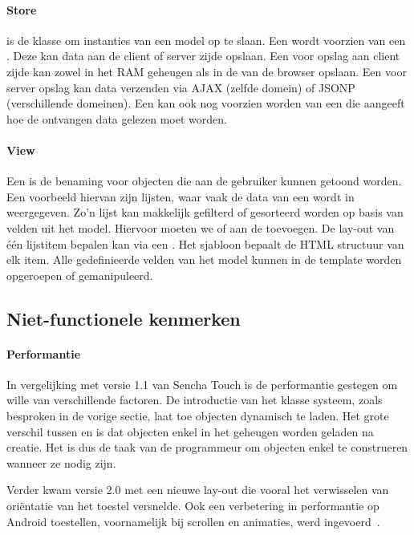 \paragraph{Store}
 is de klasse om instanties van een model op te slaan.  
Een  wordt voorzien van een .  
Deze kan data aan de client of server zijde opslaan.  
Een  voor opslag aan client zijde kan zowel in het RAM geheugen als in de  van de browser opslaan.  
Een  voor server opslag kan data verzenden via AJAX (zelfde domein) of JSONP (verschillende domeinen).  
Een  kan ook nog voorzien worden van een  die aangeeft hoe de ontvangen data gelezen moet worden.

\paragraph{View}
Een  is de benaming voor objecten die aan de gebruiker kunnen getoond worden.  
Een voorbeeld hiervan zijn lijsten,  waar vaak de data van een  wordt in weergegeven.  
Zo'n lijst kan makkelijk gefilterd of gesorteerd worden op basis van velden uit het model.  
Hiervoor moeten we  of  aan de  toevoegen. 
De lay-out van één lijstitem bepalen kan via een .  
Het sjabloon bepaalt de HTML structuur van elk item.  
Alle gedefinieerde velden van het model kunnen in de template worden opgeroepen of gemanipuleerd.


\subsection{Niet-functionele kenmerken}
\paragraph{Performantie}
In vergelijking met versie 1.1 van Sencha Touch is de performantie gestegen om wille van verschillende factoren.  
De introductie van het klasse systeem,  zoals besproken in de vorige sectie,  laat toe objecten dynamisch te laden. 
Het grote verschil tussen  en  is dat objecten enkel in het geheugen worden geladen na creatie.  
Het is dus de taak van de programmeur om objecten enkel te construeren wanneer ze nodig zijn.

Verder kwam versie 2.0 met een nieuwe lay-out  die vooral het verwisselen van oriëntatie van het toestel versnelde.  
Ook een verbetering in performantie op Android toestellen,  voornamelijk bij scrollen en animaties,  werd ingevoerd~\cite{Inc.}.

